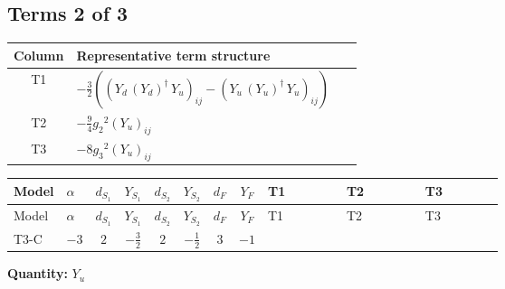 \documentclass[8pt]{article}
\begin{document}
\begin{landscape}
\subsection*{Terms 2 of 3}
\begin{center}
\begin{tabular}{@{}c >{\raggedright\arraybackslash}p{0.82\linewidth}@{}}
\toprule
Column & Representative term structure \\
\midrule
T1 & \(\displaystyle -\frac{3}{2} (\left({Y_d}\,\left({Y_d}\right)^{\dagger}\,{Y_u}\right)_{ij}-\left({Y_u}\,\left({Y_u}\right)^{\dagger}\,{Y_u}\right)_{ij})\) \\
\midrule
T2 & \(\displaystyle -\frac{9}{4} {g_2}^2 \left({Y_u}\right)_{ij}\) \\
\midrule
T3 & \(\displaystyle -8 {g_3}^2 \left({Y_u}\right)_{ij}\) \\
\midrule
\bottomrule
\end{tabular}
\end{center}
\smallskip
\tiny
\begin{longtable}{@{}llcccccc >{\raggedright\arraybackslash}p{0.21\linewidth} >{\raggedright\arraybackslash}p{0.21\linewidth} >{\raggedright\arraybackslash}p{0.21\linewidth}@{}}
\toprule
Model & $\alpha$ & $d_{S_1}$ & $Y_{S_1}$ & $d_{S_2}$ & $Y_{S_2}$ & $d_F$ & $Y_F$ & T1 & T2 & T3 \\
\midrule
\endfirsthead
\toprule
Model & $\alpha$ & $d_{S_1}$ & $Y_{S_1}$ & $d_{S_2}$ & $Y_{S_2}$ & $d_F$ & $Y_F$ & T1 & T2 & T3 \\
\midrule
\endhead
T3-C & $-3$ & $2$ & $-\frac{3}{2}$ & $2$ & $-\frac{1}{2}$ & $3$ & $-1$ & \scriptsize\adjustbox{max width=\linewidth}{$\begin{gathered} -\frac{3}{2} (\left({Y_d}\,\left({Y_d}\right)^{\dagger}\,{Y_u}\right)_{ij}-\left({Y_u}\,\left({Y_u}\right)^{\dagger}\,{Y_u}\right)_{ij})\end{gathered}$} & \scriptsize\adjustbox{max width=\linewidth}{$\begin{gathered} -\frac{9}{4} {g_2}^2 \left({Y_u}\right)_{ij}\end{gathered}$} & \scriptsize\adjustbox{max width=\linewidth}{$\begin{gathered} -8 {g_3}^2 \left({Y_u}\right)_{ij}\end{gathered}$} \\
\midrule
\bottomrule
\end{longtable}
\clearpage
\noindent\textbf{Quantity: }$Y_u$\par\smallskip

\end{landscape}
\end{document}
